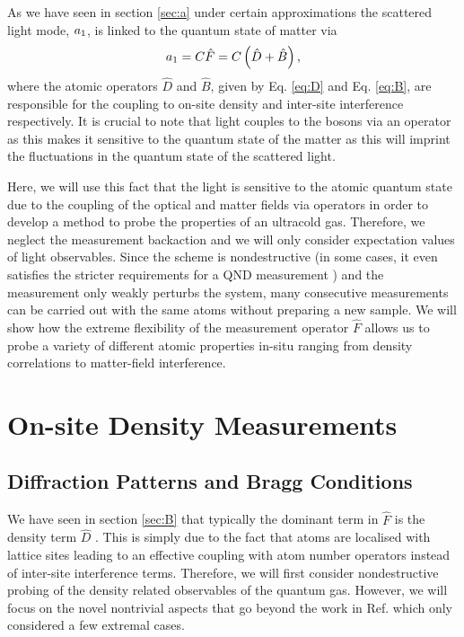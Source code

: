 As we have seen in section \ref{sec:a} under certain approximations
the scattered light mode, $a_1$, is linked to the quantum state of
matter via 
\begin{equation}
  \label{eq:a-3}
  a_1 = C \hat{F} = C \left(\hat{D} + \hat{B} \right),
\end{equation}
where the atomic operators $\hat{D}$ and $\hat{B}$, given by
Eq. \eqref{eq:D} and Eq. \eqref{eq:B}, are responsible for the
coupling to on-site density and inter-site interference
respectively. It is crucial to note that light couples to the bosons
via an operator as this makes it sensitive to the quantum state of the
matter as this will imprint the fluctuations in the quantum state of
the scattered light.

Here, we will use this fact that the light is sensitive to the atomic
quantum state due to the coupling of the optical and matter fields via
operators in order to develop a method to probe the properties of an
ultracold gas. Therefore, we neglect the measurement backaction and
we will only consider expectation values of light observables. Since
the scheme is nondestructive (in some cases, it even satisfies the
stricter requirements for a QND measurement \cite{mekhov2012,
  mekhov2007pra}) and the measurement only weakly perturbs the system,
many consecutive measurements can be carried out with the same atoms
without preparing a new sample. We will show how the extreme
flexibility of the measurement operator $\hat{F}$ allows us to
probe a variety of different atomic properties in-situ ranging from
density correlations to matter-field interference.

\section{On-site Density Measurements}

\subsection{Diffraction Patterns and Bragg Conditions}

We have seen in section \ref{sec:B} that typically the dominant term
in $\hat{F}$ is the density term $\hat{D}$ \cite{mekhov2007pra,
  LP2009, rist2010, lakomy2009, ruostekoski2009}. This is simply due
to the fact that atoms are localised with lattice sites leading to an
effective coupling with atom number operators instead of inter-site
interference terms. Therefore, we will first consider nondestructive
probing of the density related observables of the quantum
gas. However, we will focus on the novel nontrivial aspects that go
beyond the work in Ref. \cite{mekhov2012, mekhov2007prl,
  mekhov2007pra} which only considered a few extremal cases.

